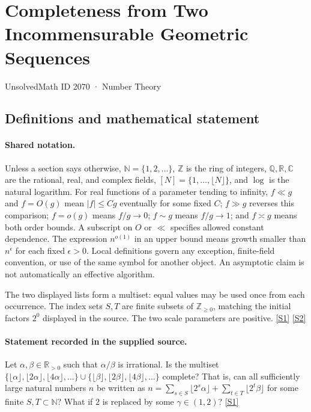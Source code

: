\documentclass[11pt,a4paper]{article}
\newcommand{\N}{\mathbb{N}}
\newcommand{\Z}{\mathbb{Z}}
\newcommand{\Q}{\mathbb{Q}}
\newcommand{\R}{\mathbb{R}}
\newcommand{\C}{\mathbb{C}}
\newcommand{\sref}[2]{\hyperlink{source:#1:#2}{[S#2]}}
\begin{document}

\setcounter{section}{2069}

\section{Completeness from Two Incommensurable Geometric Sequences}\label{2070}

{\small\sffamily UnsolvedMath ID 2070 · Number Theory}

\subsection{Definitions and mathematical statement}

\paragraph{Shared notation.}Unless a section says otherwise, $\N=\{1,2,\ldots\}$,
$\Z$ is the ring of integers, $\Q,\R,\C$ are the rational, real, and complex
fields, $[N]=\{1,\ldots,\lfloor N\rfloor\}$, and $\log$ is the natural
logarithm. For real functions of a parameter tending to infinity,
$f\ll g$ and $f=O(g)$ mean $|f|\leq Cg$ eventually for some fixed $C$;
$f\gg g$ reverses this comparison; $f=o(g)$ means $f/g\to0$;
$f\sim g$ means $f/g\to1$; and $f\asymp g$ means both order bounds.
A subscript on $O$ or $\ll$ specifies allowed constant dependence.
The expression $n^{o(1)}$ in an upper bound means growth smaller than
$n^\epsilon$ for each fixed $\epsilon>0$. Local definitions govern any
exception, finite-field convention, or use of the same symbol for another
object. An asymptotic claim is not automatically an effective algorithm.



The two displayed lists form a multiset: equal values may be used once from each occurrence. The index sets $S,T$ are finite subsets of $\Z_{\geq0}$, matching the initial factors $2^0$ displayed in the source. The two scale parameters are positive. \sref{2070}{1} \sref{2070}{2}

\paragraph{Statement recorded in the supplied source.}
Let $\alpha,\beta\in \mathbb{R}_{>0}$ such that $\alpha/\beta$ is irrational. Is the multiset $ \{ \lfloor \alpha\rfloor,\lfloor 2\alpha\rfloor,\lfloor 4\alpha\rfloor,\ldots\}\cup \{ \lfloor \beta\rfloor,\lfloor 2\beta\rfloor,\lfloor 4\beta\rfloor,\ldots\} $ complete? That is, can all sufficiently large natural numbers $n$ be written as $ n=\sum_{s\in S}\lfloor 2^s\alpha\rfloor+\sum_{t\in T}\lfloor 2^t\beta\rfloor $ for some finite $S,T\subset \mathbb{N}$?
What if $2$ is replaced by some $\gamma\in(1,2)$? \sref{2070}{1}
\end{document}
